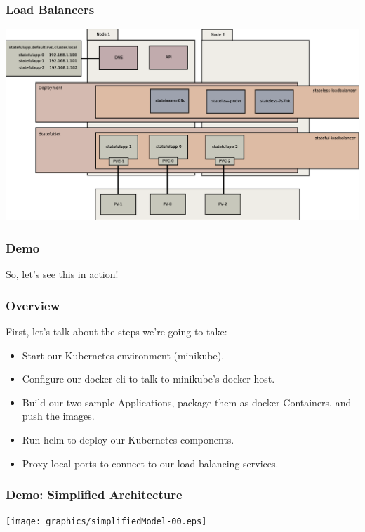     \begin{frame}
        \frametitle{Load Balancers}
        \includegraphics[width=\textwidth,height=0.85\textheight,keepaspectratio]{graphics/08-loadBalancer.eps}
    \end{frame}

    \begin{frame}
        \frametitle{Demo}
        \begin{center}
            \Huge So, let's see this in action!
        \end{center}
    \end{frame}

    \begin{frame}
        \frametitle{Overview}
        First, let's talk about the steps we're going to take:
        \begin{itemize}
            \item Start our Kubernetes environment (minikube).\pause
            \item Configure our docker cli to talk to minikube's docker host.\pause
            \item Build our two sample Applications, package them as docker Containers, and push the images.\pause
            \item Run helm to deploy our Kubernetes components.\pause
            \item Proxy local ports to connect to our load balancing services.
        \end{itemize}
    \end{frame}

    \begin{frame}
        \frametitle{Demo: Simplified Architecture}
        \texttt{[image: graphics/simplifiedModel-00.eps]}
    \end{frame}

